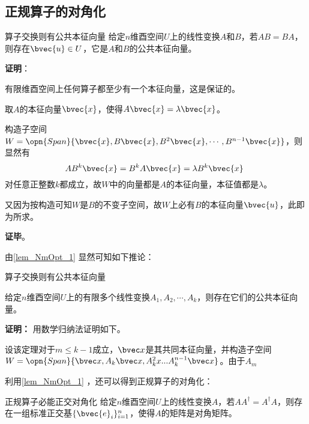 \subsection{正规算子的对角化}

\begin{lemma}{算子交换则有公共本征向量}\label{lem_NmOpt_1}
给定$n$维酉空间$U$上的线性变换$A$和$B$，若$AB=BA$，则存在$\bvec{u}\in U$，它是$A$和$B$的公共本征向量。
\end{lemma}


\textbf{证明}：

有限维酉空间上任何算子都至少有一个本征向量，这是保证的。

取$A$的本征向量$\bvec{x}$，使得$A\bvec{x}=\lambda\bvec{x}$。

构造子空间$W=\opn{Span}\{\bvec{x}, B\bvec{x}, B^2\bvec{x}, \cdots, B^{n-1}\bvec{x}\}$，则显然有
\begin{equation}
AB^k\bvec{x} = B^kA\bvec{x} = \lambda B^k\bvec{x}~
\end{equation}
对任意正整数$k$都成立，故$W$中的向量都是$A$的本征向量，本征值都是$\lambda$。

又因为按构造可知$W$是$B$的不变子空间，故$W$上必有$B$的本征向量$\bvec{u}$，此即为所求。

\textbf{证毕}。



由\autoref{lem_NmOpt_1} 显然可知如下推论：

\begin{corollary}{算子交换则有公共本征向量}\label{cor_NmOpt_1}

给定$n$维酉空间$U$上的有限多个线性变换$A_1, A_2, \cdots, A_k$，则存在它们的公共本征向量。

\end{corollary}
\textbf{证明：}
用数学归纳法证明如下。

设该定理对于$m\leq k-1$成立，$\bvec x$是其共同本征向量，并构造子空间$W=\opn{Span}\{\bvec x,A_{k}\bvec x,A_{k}^2x...A^{n-1}_{k}\bvec x\}$。由于$A_m$



利用\autoref{lem_NmOpt_1} ，还可以得到正规算子的对角化：


\begin{theorem}{正规算子必能正交对角化}\label{the_NmOpt_1}
给定$n$维酉空间$U$上的线性变换$A$，若$AA^\dagger = A^\dagger A$，则存在一组标准正交基$\{\bvec{e}_i\}_{i=1}^n$，使得$A$的矩阵是对角矩阵。
\end{theorem}

